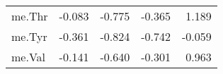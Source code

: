 \begin{tabular}{lrrrr}
me.Thr & {\cellcolor[HTML]{F1EFF2}} \color[HTML]{000000} -0.083 & {\cellcolor[HTML]{6087BD}} \color[HTML]{F1F1F1} -0.775 & {\cellcolor[HTML]{B7C2D5}} \color[HTML]{000000} -0.365 & {\cellcolor[HTML]{A9373B}} \color[HTML]{F1F1F1} 1.189 \\
me.Tyr & {\cellcolor[HTML]{B7C2D5}} \color[HTML]{000000} -0.361 & {\cellcolor[HTML]{5581BC}} \color[HTML]{F1F1F1} -0.824 & {\cellcolor[HTML]{698CBE}} \color[HTML]{F1F1F1} -0.742 & {\cellcolor[HTML]{F5F2F4}} \color[HTML]{000000} -0.059 \\
me.Val & {\cellcolor[HTML]{E4E5EB}} \color[HTML]{000000} -0.141 & {\cellcolor[HTML]{7E9AC2}} \color[HTML]{F1F1F1} -0.640 & {\cellcolor[HTML]{C3CBDA}} \color[HTML]{000000} -0.301 & {\cellcolor[HTML]{AC3E40}} \color[HTML]{F1F1F1} 0.963 \\
\end{tabular}

